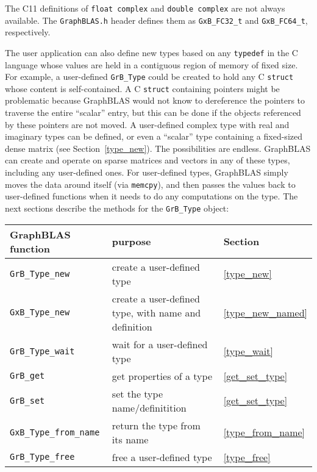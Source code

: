 \documentclass[12pt]{article}
\begin{document}
The C11 definitions of \verb'float complex' and \verb'double complex'
are not always available.  The \verb'GraphBLAS.h' header defines them as
\verb'GxB_FC32_t' and \verb'GxB_FC64_t', respectively.

The user application can also define new types based on any \verb'typedef' in
the C language whose values are held in a contiguous region of memory of fixed
size.  For example, a user-defined \verb'GrB_Type' could be created to hold any
C \verb'struct' whose content is self-contained.  A C \verb'struct' containing
pointers might be problematic because GraphBLAS would not know to dereference
the pointers to traverse the entire ``scalar'' entry, but this can be done if
the objects referenced by these pointers are not moved.  A user-defined complex
type with real and imaginary types can be defined, or even a ``scalar'' type
containing a fixed-sized dense matrix (see Section~\ref{type_new}).  The
possibilities are endless.  GraphBLAS can create and operate on sparse matrices
and vectors in any of these types, including any user-defined ones.  For
user-defined types, GraphBLAS simply moves the data around itself (via
\verb'memcpy'), and then passes the values back to user-defined functions when
it needs to do any computations on the type.  The next sections describe the
methods for the \verb'GrB_Type' object:

\vspace{0.2in}
{\footnotesize
\begin{tabular}{lll}
\hline
GraphBLAS function       & purpose                          & Section \\
\hline
\verb'GrB_Type_new'      & create a user-defined type       & \ref{type_new} \\
\verb'GxB_Type_new'      & create a user-defined type,
                            with name and definition        & \ref{type_new_named} \\
\verb'GrB_Type_wait'     & wait for a user-defined type     & \ref{type_wait} \\
\verb'GrB_get'           & get properties of a type         & \ref{get_set_type} \\
\verb'GrB_set'           & set the type name/definitition   & \ref{get_set_type} \\
\verb'GxB_Type_from_name'& return the type from its name    & \ref{type_from_name} \\
\verb'GrB_Type_free'     & free a user-defined type         & \ref{type_free} \\
\hline
\end{tabular}
}
\end{document}
